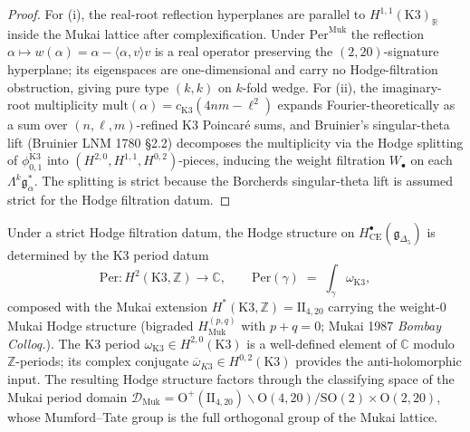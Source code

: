 \begin{proof}
For (i), the real-root reflection hyperplanes are parallel to
$H^{1,1}(\mathrm{K3})_{\mathbb{R}}$ inside the Mukai lattice after
complexification. Under $\mathrm{Per}^{\mathrm{Muk}}$ the reflection
$\alpha \mapsto w(\alpha) = \alpha - \langle\alpha, v\rangle v$ is
a real operator preserving the $(2,20)$-signature hyperplane; its
eigenspaces are one-dimensional and carry no Hodge-filtration
obstruction, giving pure type $(k,k)$ on $k$-fold wedge. For (ii), the
imaginary-root multiplicity $\mathrm{mult}(\alpha) =
c_{\mathrm{K3}}(4nm-\ell^2)$ expands Fourier-theoretically as a sum
over $(n,\ell,m)$-refined K3 Poincar\'e sums, and Bruinier's
singular-theta lift (Bruinier LNM 1780 \S 2.2) decomposes the
multiplicity via the Hodge splitting of $\phi_{0,1}^{\mathrm{K3}}$
into $(H^{2,0}, H^{1,1}, H^{0,2})$-pieces, inducing the weight
filtration $W_\bullet$ on each $\Lambda^k \mathfrak{g}_\alpha^*$.
The splitting is strict because the Borcherds singular-theta lift
is assumed strict for the Hodge filtration datum.
\end{proof}

\begin{corollary}
\label{cor:cycat-ce-motivic-origin}
Under a strict Hodge filtration datum, the Hodge structure on
$H^\bullet_{\mathrm{CE}}(\mathfrak{g}_{\Delta_5})$ is determined by the
K3 period datum
\[
 \mathrm{Per} \colon H^2(\mathrm{K3}, \mathbb{Z}) \longrightarrow \mathbb{C}, \qquad
 \mathrm{Per}(\gamma) \;=\; \int_\gamma \omega_{\mathrm{K3}},
\]
composed with the Mukai extension $H^*(\mathrm{K3}, \mathbb{Z}) =
\mathrm{II}_{4,20}$ carrying the weight-0 Mukai Hodge structure
(bigraded $H^{(p,q)}_{\mathrm{Muk}}$ with $p+q = 0$; Mukai 1987
\emph{Bombay Colloq.}). The K3 period $\omega_{\mathrm{K3}} \in
H^{2,0}(\mathrm{K3})$ is a well-defined element of $\mathbb{C}$ modulo
$\mathbb{Z}$-periods; its complex conjugate $\overline{\omega}_{K3}
\in H^{0,2}(\mathrm{K3})$ provides the anti-holomorphic input. The
resulting Hodge structure factors through the classifying space of
the Mukai period domain $\mathcal{D}_{\mathrm{Muk}} =
\mathrm{O}^+(\mathrm{II}_{4,20})\backslash \mathrm{O}(4,20)/\mathrm{SO}(2)\times
\mathrm{O}(2,20)$, whose Mumford--Tate group is the full orthogonal
group of the Mukai lattice.
\end{corollary}

